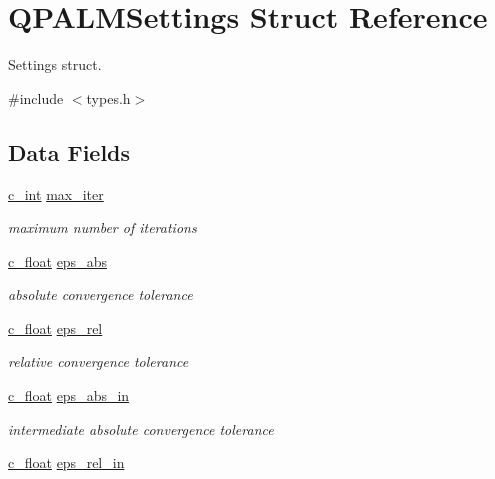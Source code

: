 \hypertarget{structQPALMSettings}{}\section{Q\+P\+A\+L\+M\+Settings Struct Reference}
\label{structQPALMSettings}


Settings struct.  




{\ttfamily \#include $<$types.\+h$>$}

\subsection*{Data Fields}
\begin{DoxyCompactItemize}
\item 
\mbox{\hyperlink{global__opts_8h_aa3217a0f49d3e52b74e9dd830c44472f}{c\+\_\+int}} \mbox{\hyperlink{structQPALMSettings_abde94c03c9e4331e2ec9939746653371}{max\+\_\+iter}}
\begin{DoxyCompactList}\small\item\em maximum number of iterations \end{DoxyCompactList}\item 
\mbox{\hyperlink{global__opts_8h_a7f1a9fda95e52979658c20a0d134fb15}{c\+\_\+float}} \mbox{\hyperlink{structQPALMSettings_adadd5ae5aada22693f708c55678777f4}{eps\+\_\+abs}}
\begin{DoxyCompactList}\small\item\em absolute convergence tolerance \end{DoxyCompactList}\item 
\mbox{\hyperlink{global__opts_8h_a7f1a9fda95e52979658c20a0d134fb15}{c\+\_\+float}} \mbox{\hyperlink{structQPALMSettings_a9b84087d61f10c22632bd6924e33691c}{eps\+\_\+rel}}
\begin{DoxyCompactList}\small\item\em relative convergence tolerance \end{DoxyCompactList}\item 
\mbox{\hyperlink{global__opts_8h_a7f1a9fda95e52979658c20a0d134fb15}{c\+\_\+float}} \mbox{\hyperlink{structQPALMSettings_a0b5e66e45976754edbefb12c9aa6cd4d}{eps\+\_\+abs\+\_\+in}}
\begin{DoxyCompactList}\small\item\em intermediate absolute convergence tolerance \end{DoxyCompactList}\item 
\mbox{\hyperlink{global__opts_8h_a7f1a9fda95e52979658c20a0d134fb15}{c\+\_\+float}} \mbox{\hyperlink{structQPALMSettings_a3772b3f15b95f5d913f9a7e892e070dd}{eps\+\_\+rel\+\_\+in}}

\end{DoxyCompactItemize}
